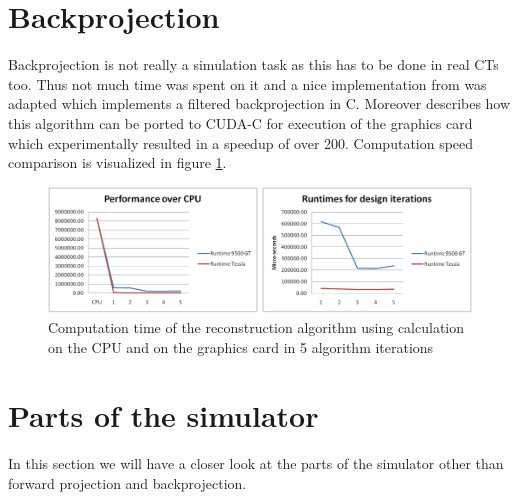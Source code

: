 \section{Backprojection}
\par Backprojection is not really a simulation task as this has to be done in real CTs too. Thus not much time was spent on it and a nice implementation from \cite{CUDABackprojection} was adapted which implements a filtered backprojection in C. Moreover \cite{CUDABackprojection} describes how this algorithm can be ported to CUDA-C for execution of the graphics card which experimentally resulted in a speedup of over 200. Computation speed comparison is visualized in figure \ref{ArnesenSpeedup}.
\begin{figure}[h!]
	\centering
	\includegraphics[width=\linewidth]{images/ArnesenSpeedupCombined.png}
	\caption{Computation time of the reconstruction algorithm using calculation on the CPU and on the graphics card in 5 algorithm iterations\cite{CUDABackprojection}}
	\label{ArnesenSpeedup}
\end{figure}
\section{Parts of the simulator}
\par In this section we will have a closer look at the parts of the simulator other than forward projection and backprojection.
